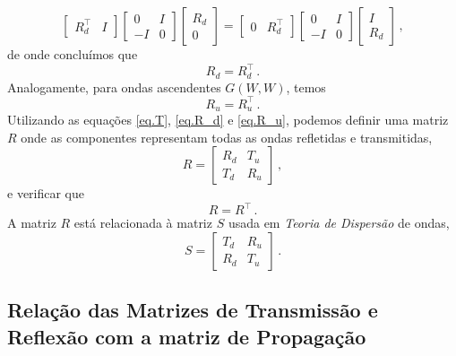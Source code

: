 \begin{equation*}
\begin{bmatrix}
R_d^\top&I
\end{bmatrix}
\begin{bmatrix}
0&I\\
-I&0
\end{bmatrix}
\begin{bmatrix}
R_d\\
0
\end{bmatrix}
=
\begin{bmatrix}
0&R_d^\top
\end{bmatrix}
\begin{bmatrix}
0&I\\
-I&0
\end{bmatrix}
\begin{bmatrix}
I\\
R_d
\end{bmatrix}\,,
\end{equation*}
de onde conclu\'imos que 
\begin{equation}\label{eq.R_d}
R_d=R_d^\top\,.
\end{equation}
Analogamente, para ondas ascendentes $G(W,W)$, temos \begin{equation}\label{eq.R_u}
R_u=R_u^\top\,.
\end{equation}
Utilizando as equa\c{c}\~oes \ref{eq.T}, \ref{eq.R_d} e \ref{eq.R_u}, podemos definir uma matriz $R$ onde as componentes representam todas as ondas refletidas e transmitidas,
\begin{equation*}
R=
\begin{bmatrix}
R_d&T_u\\
T_d&R_u
\end{bmatrix}\,,
\end{equation*}
e verificar que 
\begin{equation*}
R=R^\top\,.
\end{equation*}
A matriz $R$ est\'a relacionada \`a matriz $S$ usada em \textit{Teoria de Dispers\~ao} de ondas,
\begin{equation*}
S=
\begin{bmatrix}
T_d&R_u\\
R_d&T_u
\end{bmatrix}\,.
\end{equation*}

\subsection{Rela\c{c}\~ao das Matrizes de Transmiss\~ao e Reflex\~ao com a matriz de Propaga\c{c}\~ao}

